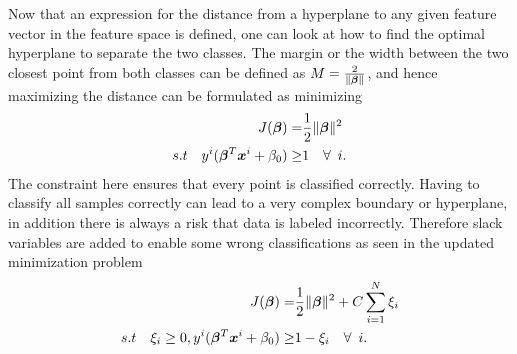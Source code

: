             Now that an expression for the distance from a hyperplane to any given feature vector in the feature space is defined, one can look at how to find the optimal hyperplane to separate the two classes. The margin or the width between the two closest point from both classes can be defined as $M = \frac{2}{\lVert\bm \beta\rVert}$, and hence maximizing the distance can be formulated as minimizing
            \begin{align}
                J(\bm \beta) = & \frac{1}{2}\lVert\bm \beta\rVert^2 \nonumber \\
                 s.t \quad y^i(\bm \beta^T\bm x^i + \beta_0) \geq & 1 \quad \forall \enspace i.
                \label{svm:cost}
            \end{align}
            The constraint here ensures that every point is classified correctly. Having to classify all samples correctly can lead to a very complex boundary or hyperplane, in addition there is always a risk that data is labeled incorrectly. Therefore slack variables are added to enable some wrong classifications as seen in the updated minimization problem
            \begin{align}
                J(\bm \beta) = & \frac{1}{2}\lVert\bm \beta\rVert^2  + C \sum_{i=1}^N \xi_i \nonumber \\
                 s.t \quad \xi_i \geq 0, y^i(\bm \beta^T\bm x^i + \beta_0) \geq & 1 - \xi_i \quad \forall \enspace i.
                \label{svm:cost}
            \end{align}
            
